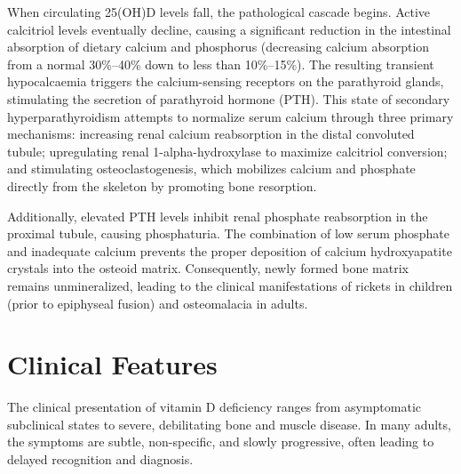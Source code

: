 When circulating 25(OH)D levels fall, the pathological cascade begins. Active calcitriol levels eventually decline, causing a significant reduction in the intestinal absorption of dietary calcium and phosphorus (decreasing calcium absorption from a normal 30\%--40\% down to less than 10\%--15\%). The resulting transient hypocalcaemia triggers the calcium-sensing receptors on the parathyroid glands, stimulating the secretion of parathyroid hormone (PTH). This state of secondary hyperparathyroidism attempts to normalize serum calcium through three primary mechanisms: increasing renal calcium reabsorption in the distal convoluted tubule; upregulating renal 1-alpha-hydroxylase to maximize calcitriol conversion; and stimulating osteoclastogenesis, which mobilizes calcium and phosphate directly from the skeleton by promoting bone resorption.

Additionally, elevated PTH levels inhibit renal phosphate reabsorption in the proximal tubule, causing phosphaturia. The combination of low serum phosphate and inadequate calcium prevents the proper deposition of calcium hydroxyapatite crystals into the osteoid matrix. Consequently, newly formed bone matrix remains unmineralized, leading to the clinical manifestations of rickets in children (prior to epiphyseal fusion) and osteomalacia in adults.

\section*{Clinical Features}
The clinical presentation of vitamin D deficiency ranges from asymptomatic subclinical states to severe, debilitating bone and muscle disease. In many adults, the symptoms are subtle, non-specific, and slowly progressive, often leading to delayed recognition and diagnosis.

